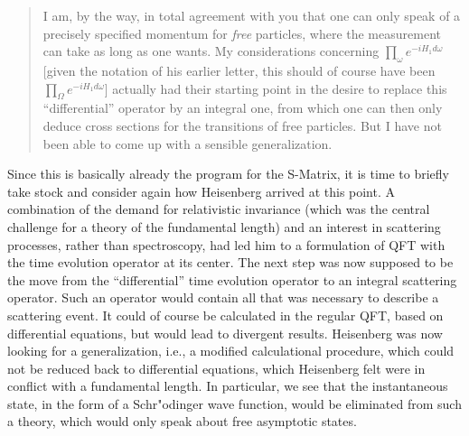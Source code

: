 \documentclass[12pt,a4paper]{article}
\begin{document}
\begin{quote}
I am, by the way, in total agreement with you that one can only speak of a precisely specified momentum for \emph{free} particles, where the measurement can take as long as one wants. My considerations concerning $\prod_{\omega} e^{-i H_1 d \omega}$ [given the notation of his earlier letter, this should of course have been $\prod_{\Omega} e^{-i H_1 d \omega}$]  actually had their starting point in the desire to replace this ``differential'' operator by an integral one, from which one can then only deduce cross sections for the transitions of free particles. But I have not been able to come up with a sensible generalization.
\end{quote}

Since this is basically already the program for the S-Matrix, it is time to briefly take stock and consider again how Heisenberg arrived at this point. A combination of the demand for relativistic invariance (which was the central challenge for a theory of the fundamental length) and an interest in scattering processes, rather than spectroscopy, had led him to a formulation of QFT with the time evolution operator at its center. The next step was now supposed to be the move from the ``differential'' time evolution operator to an integral scattering operator. Such an operator would contain all that was necessary to describe a scattering event. It could of course be calculated in the regular QFT, based on differential equations, but would lead to divergent results. Heisenberg was now looking for a generalization, i.e., a modified calculational procedure, which could not be reduced back to differential equations, which Heisenberg felt were in conflict with a fundamental length. In particular, we see that the instantaneous state, in the form of a Schr"odinger wave function, would be eliminated from such a theory, which would only speak about free asymptotic states.
\end{document}
